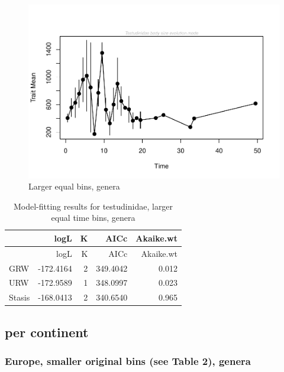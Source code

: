 \documentclass[]{article}
\begin{document}
\begin{figure}[htbp]
\centering
\includegraphics{MA_JJ_files/figure-latex/Play around with larger time bins, generic level-1.pdf}
\caption{Larger equal bins, genera}
\end{figure}

\begin{longtable}[]{@{}lrrrr@{}}
\caption{Model-fitting results for testudinidae, larger equal time bins,
genera}\tabularnewline
\toprule
& logL & K & AICc & Akaike.wt\tabularnewline
\midrule
\endfirsthead
\toprule
& logL & K & AICc & Akaike.wt\tabularnewline
\midrule
\endhead
GRW & -172.4164 & 2 & 349.4042 & 0.012\tabularnewline
URW & -172.9589 & 1 & 348.0997 & 0.023\tabularnewline
Stasis & -168.0413 & 2 & 340.6540 & 0.965\tabularnewline
\bottomrule
\end{longtable}

\newpage

\subsection{per continent}\label{per-continent}

\subsubsection{Europe, smaller original bins (see Table 2),
genera}\label{europe-smaller-original-bins-see-table-2-genera}
\end{document}
